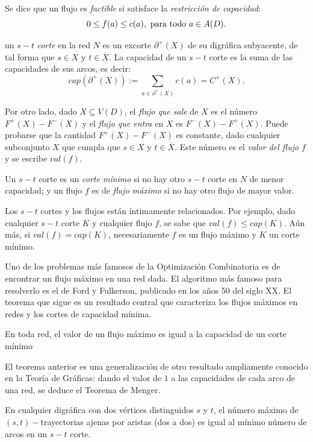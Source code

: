 Se dice que un flujo es \textit{factible} si satisface la \textit{restricción de capacidad}: $$0 \leq f(a) \leq c(a), \textnormal{ para todo } a \in A(D).$$

un $s-t$ \textit{corte} en la red $N$ es un excorte $\partial^{+}(X)$ de su digráfica subyacente, de tal forma que $s \in X$ y $t\in \overline{X}$. La capacidad de un $s-t$ corte es la suma de las capacidades de sus arcos, es decir:$$cap(\partial^{+}(X)):=\sum_{a \in \partial^{+}(X)}c(a) = C^{+}(X).$$

Por otro lado, dado $X\subseteq V(D)$, el \textit{flujo que sale} de $X$ es el número $F^{+}(X)- F^{-}(X)$ y el \textit{flujo que entra} en $X$ es $F^{-}(X)- F^{+}(X)$. Puede probarse que la cantidad  $F^{+}(X)- F^{-}(X)$ es constante, dado cualquier subconjunto $X$ que cumpla que $s \in X$ y $t\in \overline{X}$. Este número es el \textit{valor del flujo $f$} y se escribe $val(f)$.

Un $s -t$ corte es un \textit{corte mínimo} si no hay otro $s-t$ corte en $N$ de menor capacidad; y un flujo $f$ es de \textit{flujo máximo} si no hay otro flujo de mayor valor. 

Los $s -t$ cortes y los flujos están íntimamente relacionados. Por ejemplo, dado cualquier $s-t$ corte $K$ y cualquier flujo $f$, se sabe que $val(f) \leq cap(K)$. Aún más, si $val(f) = cap(K)$, necesariamente $f$ es un flujo máximo y $K$ un corte  mínimo.

Uno de los problemas más famosos de la Optimización Combinatoria es de encontrar un flujo máximo en una red dada. El algoritmo más famoso para resolverlo es el de Ford y Fulkerson, publicado en los años 50 del siglo XX. El teorema que sigue es un resultado central que caracteriza los flujos máximos en redes y los cortes de capacidad mínima.

\begin{teo}
En toda red, el valor de un flujo máximo es igual a la capacidad de un corte mínimo
\end{teo}

El teorema anterior es una generalización de otro resultado ampliamente conocido en la Teoría de Gráficas: dando el valor de $1$ a las capacidades de cada arco de una red, se deduce el Teorema de Menger.

\begin{teo}
En cualquier digráfica con dos vértices distinguidos $s$ y $t$, el número máximo de $(s,t)-$trayectorias ajenas por aristas (dos a dos) es igual al mínimo número de arcos en un $s-t$ corte.
\end{teo}

